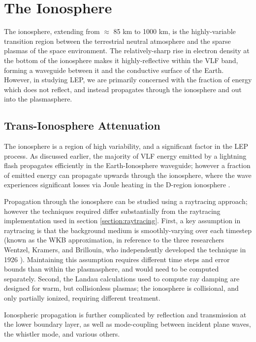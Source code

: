 \section{The Ionosphere}
The ionosphere, extending from $\approx$ 85 km to 1000 km, is the highly-variable transition region between the terrestrial neutral atmosphere and the sparse plasmas of the space environment. The relatively-sharp rise in electron density at the bottom of the ionosphere makes it highly-reflective within the VLF band, forming a waveguide between it and the conductive surface of the Earth. However, in studying LEP, we are primarily concerned with the fraction of energy which does not reflect, and instead propagates through the ionosphere and out into the plasmasphere.

\subsection{Trans-Ionosphere Attenuation}
\label{section:trans_ionosphere_atten}
The ionosphere is a region of high variability, and a significant factor in the LEP process. As discussed earlier, the majority of VLF energy emitted by a lightning flash propagates efficiently in the Earth-Ionosphere waveguide; however a fraction of emitted energy can propagate upwards through the ionosphere, where the wave experiences significant losses via Joule heating in the D-region ionosphere \citep{Graf2013, Marshall2014, Blaes2016}.

Propagation through the ionosphere can be studied using a raytracing approach; however the techniques required differ substantially from the raytracing implementation used in section \ref{section:raytracing}. First, a key assumption in raytracing is that the background medium is smoothly-varying over each timestep (known as the WKB approximation, in reference to the three researchers Wentzel, Kramers, and Brillouin, who independently developed the technique in 1926 \citep{Bender1999}). Maintaining this assumption requires different time steps and error bounds than within the plasmasphere, and would need to be computed separately. Second, the Landau calculations used to compute ray damping are designed for warm, but collisionless plasmas; the ionosphere is collisional, and only partially ionized, requiring different treatment.

Ionospheric propagation is further complicated by reflection and transmission at the lower boundary layer, as well as mode-coupling between incident plane waves, the whistler mode, and various others. 

